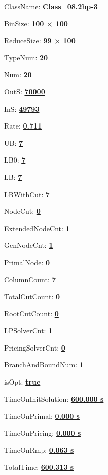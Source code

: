\documentclass[11pt]{article}
\begin{document}
\pagestyle{empty}


ClassName: \underline{\textbf{Class_08.2bp-3}}
\par
BinSize: \underline{\textbf{100 × 100}}
\par
ReduceSize: \underline{\textbf{99 × 100}}
\par
TypeNum: \underline{\textbf{20}}
\par
Num: \underline{\textbf{20}}
\par
OutS: \underline{\textbf{70000}}
\par
InS: \underline{\textbf{49793}}
\par
Rate: \underline{\textbf{0.711}}
\par
UB: \underline{\textbf{7}}
\par
LB0: \underline{\textbf{7}}
\par
LB: \underline{\textbf{7}}
\par
LBWithCut: \underline{\textbf{7}}
\par
NodeCut: \underline{\textbf{0}}
\par
ExtendedNodeCnt: \underline{\textbf{1}}
\par
GenNodeCnt: \underline{\textbf{1}}
\par
PrimalNode: \underline{\textbf{0}}
\par
ColumnCount: \underline{\textbf{7}}
\par
TotalCutCount: \underline{\textbf{0}}
\par
RootCutCount: \underline{\textbf{0}}
\par
LPSolverCnt: \underline{\textbf{1}}
\par
PricingSolverCnt: \underline{\textbf{0}}
\par
BranchAndBoundNum: \underline{\textbf{1}}
\par
isOpt: \underline{\textbf{true}}
\par
TimeOnInitSolution: \underline{\textbf{600.000 s}}
\par
TimeOnPrimal: \underline{\textbf{0.000 s}}
\par
TimeOnPricing: \underline{\textbf{0.000 s}}
\par
TimeOnRmp: \underline{\textbf{0.063 s}}
\par
TotalTime: \underline{\textbf{600.313 s}}
\par
\newpage


\end{document}
